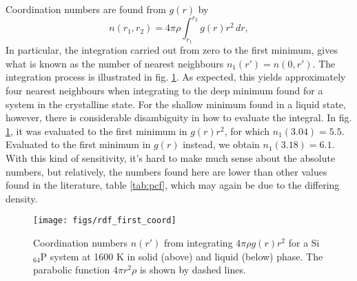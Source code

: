 \documentclass[11pt,bibliography=totoc,index=totoc]{scrbook}   %
\begin{document}
Coordination numbers are found from $g(r)$ by
\begin{equation}
    n(r_1,r_2) = 4\pi\rho \int_{r_1}^{r_2} g(r) r^2 \,dr,
    \label{eq:coordno}
\end{equation}
In particular, the integration carried out from zero to the first minimum, 
gives what is known as the number of nearest neighbours $n_1(r') = n(0,r')$.\cite[7]{Waseda:1980}
The integration process is illustrated in fig. \ref{fig:rdffirstcoord}.
As expected, this yields approximately four nearest neighbours when integrating to the deep minimum found for a system in the crystalline state.
For the shallow minimum found in a liquid state, however, there is considerable disambiguity in how to evaluate the integral.
In fig. \ref{fig:rdffirstcoord}, it was evaluated to 
the first minimum in $g(r)r^2$, for which $n_1(3.04)=5.5$.
Evaluated to the first minimum in $g(r)$ instead, we obtain $n_1(3.18) = 6.1$. 
With this kind of sensitivity, it's hard to make much sense about the absolute numbers,
but relatively, the numbers found here are lower than other values found in the literature, 
table \ref{tab:pcf}, which may again be due to the differing density.


\begin{figure}[htbp]
  \centering
  \texttt{[image: figs/rdf\_first\_coord]}
  \caption{Coordination numbers $n(r')$ from integrating $4\pi\rho g(r) r^2 $ for a Si$_64$P system
      at 1600 K in solid (above) and liquid (below) phase.
     The parabolic function $4\pi r^2 \rho$ is shown by dashed lines.
    }
  \label{fig:rdffirstcoord}
\end{figure}
\end{document}
